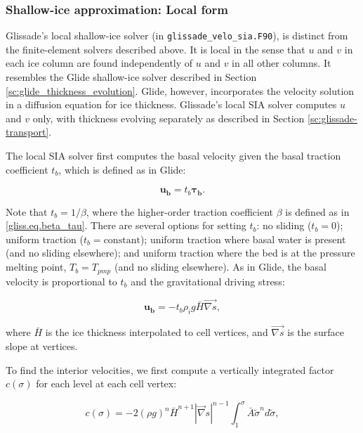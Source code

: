 \subsubsection{Shallow-ice approximation: Local form}

Glissade's local shallow-ice solver (in {\tt glissade\_velo\_sia.F90}),
is distinct from the finite-element solvers described above.
It is local in the sense that $u$ and $v$ in each ice column are found independently
of $u$ and $v$ in all other columns.
It resembles the Glide shallow-ice solver described in Section \ref{sc:glide_thickness_evolution}.
Glide, however, incorporates the velocity solution in a diffusion equation for ice thickness.
Glissade's local SIA solver computes $u$ and $v$ only, with
thickness evolving separately as described in Section \ref{sc:glissade-transport}.

The local SIA solver first computes the basal velocity given the basal traction coefficient $t_b$,
which is defined as in Glide:

\begin{equation}
  \mathbf{u_b} = t_b \mathbf{\tau_b}.
\end{equation}

\noindent
Note that $t_b = 1/\beta$, where the higher-order traction coefficient $\beta$ 
is defined as in \eqref{gliss.eq.beta_tau}.
There are several options for setting $t_b$: no sliding ($t_b = 0$);
uniform traction ($t_b = \mathrm{constant}$); uniform traction where basal water is present
(and no sliding elsewhere); and uniform traction where the bed is at the pressure melting point,
$T_b = T_{pmp}$ (and no sliding elsewhere).
As in Glide, the basal velocity is proportional to $t_b$ and the gravitational driving stress:

\begin{equation}
  \label{gliss.eq.velo_bed_sia}
        \mathbf{u_b} = -{{t}_{b}}{{\rho }_{i}} g \bar{H} \vec{\nabla s},
\end{equation}

\noindent
where $\bar{H}$ is the ice thickness interpolated to cell vertices,
and $\vec{\nabla s}$ is the surface slope at vertices.

To find the interior velocities, we
first compute a vertically integrated factor $c(\sigma)$ for each level at each cell vertex:

\begin{equation}
  \label{gliss.eq.vert_factor_sia}
  c(\sigma) = -2(\rho g)^n \bar{H}^{n+1} |\vec\nabla s|^{n-1} \int_1^{\sigma} \bar{A} \tilde{\sigma}^n d\tilde{\sigma},
\end{equation}


